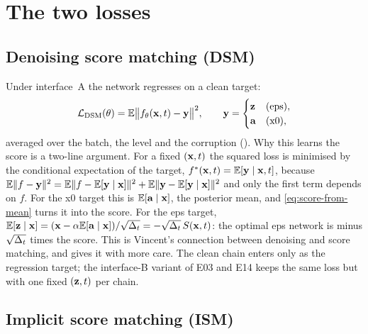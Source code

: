\section{The two losses}
\label{sec:losses}

\subsection{Denoising score matching (DSM)}

Under interface~A the network regresses on a clean target:
\begin{equation}
  \mathcal L_{\mathrm{DSM}}(\theta)=\mathbb{E}\bigl\lVert f_\theta(\mathbf{x},t)-\mathbf{y}\bigr\rVert^2,
  \qquad
  \mathbf{y}=\begin{cases}\mathbf{z}&\text{(eps)},\\ \mathbf{a}&\text{(x0)},\end{cases}
  \label{eq:dsm}
\end{equation}
averaged over the batch, the level and the corruption (). Why this
learns the score is a two-line argument. For a fixed $(\mathbf{x},t)$ the squared loss is
minimised by the conditional expectation of the target,
$f^\ast(\mathbf{x},t)=\mathbb{E}[\mathbf{y}\mid\mathbf{x},t]$, because $\mathbb{E}\lVert f-\mathbf{y}\rVert^2=\mathbb{E}\lVert f-\mathbb{E}[\mathbf{y}\mid\mathbf{x}]\rVert^2+\mathbb{E}\lVert\mathbf{y}-\mathbb{E}[\mathbf{y}\mid\mathbf{x}]\rVert^2$
and only the first term depends on $f$. For the x0 target this is $\mathbb{E}[\mathbf{a}\mid\mathbf{x}]$, the
posterior mean, and \cref{eq:score-from-mean} turns it into the score. For the eps
target, $\mathbb{E}[\mathbf{z}\mid\mathbf{x}]=(\mathbf{x}-\alpha\mathbb{E}[\mathbf{a}\mid\mathbf{x}])/\sqrt{\Delta_t}=-\sqrt{\Delta_t}\,S(\mathbf{x},t)$:
the optimal eps network is minus $\sqrt{\Delta_t}$ times the score. This is Vincent's
connection between denoising and score matching, and  gives it
with more care. The clean chain enters only as the regression target; the interface-B
variant of E03 and E14 keeps the same loss but with one fixed $(\mathbf{z},t)$ per chain.

\subsection{Implicit score matching (ISM)}

